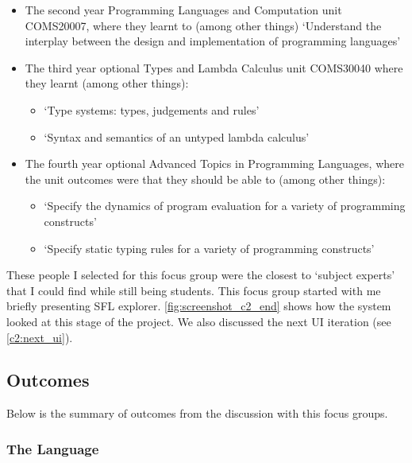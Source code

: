 \begin{itemize}
    \item The second year Programming Languages and Computation unit COMS20007, where they learnt to (among other things) `Understand the interplay between the design and implementation of programming languages' \cite{COMS20007_PLC}
    \item The third year optional Types and Lambda Calculus unit COMS30040 where they learnt (among other things): \cite{COMS30040_TLC} 
    \begin{itemize}
        \item `Type systems: types, judgements and rules'
        \item `Syntax and semantics of an untyped lambda calculus'
    \end{itemize}
    \item The fourth year optional Advanced Topics in Programming Languages, where the unit outcomes were that they should be able to (among other things): \cite{COMSM0067_ATPL}
    \begin{itemize}
        \item `Specify the dynamics of program evaluation for a variety of programming constructs'
        \item `Specify static typing rules for a variety of programming constructs'
    \end{itemize}
\end{itemize}

These people I selected for this focus group were the closest to `subject experts' that I could find while still being students. 
This focus group started with me briefly presenting SFL explorer. \ref{fig:screenshot_c2_end} shows how the system looked at this stage of the project. We also discussed the next UI iteration (see \ref{c2:next_ui}). 

\subsection{Outcomes}
Below is the summary of outcomes from the discussion with this focus groups. 

\subsubsection{The Language}
